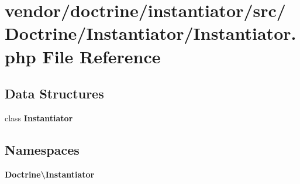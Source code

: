 \section{vendor/doctrine/instantiator/src/\+Doctrine/\+Instantiator/\+Instantiator.php File Reference}
\label{doctrine_2instantiator_2src_2_doctrine_2_instantiator_2_instantiator_8php}
\subsection*{Data Structures}
\begin{DoxyCompactItemize}
\item 
class {\bf Instantiator}
\end{DoxyCompactItemize}
\subsection*{Namespaces}
\begin{DoxyCompactItemize}
\item 
 {\bf Doctrine\textbackslash{}\+Instantiator}
\end{DoxyCompactItemize}
